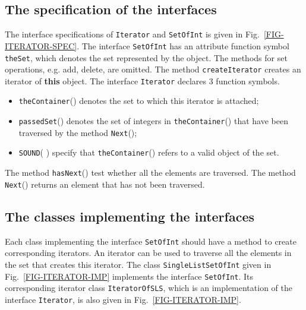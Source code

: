 \documentclass[fleqn]{llncs}
\begin{document}
\subsection{The specification of the interfaces}
The interface specifications of \texttt{Iterator} and \texttt{SetOfInt} is given in Fig.~\ref{FIG-ITERATOR-SPEC}.
The interface \texttt{SetOfInt} has an attribute function symbol \texttt{theSet}, which denotes the set represented by the
object. The methods for set operations, e.g. add, delete, are omitted. The method \texttt{createIterator} creates an iterator of \textbf{this} object.
The interface \texttt{Iterator} declares 3 function symbols.
\begin{itemize}
\item \texttt{theContainer}() denotes the set to which this iterator is attached;
\item \texttt{passedSet}() denotes the set of integers in \texttt{theContainer}() that have been traversed by the method \texttt{Next}();
\item \texttt{SOUND}( ) specify that \texttt{theContainer}() refers to a valid object of the set.
\end{itemize}
The method \texttt{hasNext}() test whether all the elements are traversed. The method \texttt{Next}() returns an element that
has not been traversed.

\subsection{The classes implementing the interfaces}
Each class implementing the interface \texttt{SetOfInt} should have a method to create corresponding iterators. An iterator can be used to traverse
all the elements in the set that creates this iterator.
The class \texttt{SingleListSetOfInt} given in Fig.~\ref{FIG-ITERATOR-IMP} implements the interface \texttt{SetOfInt}. Its corresponding iterator class
\texttt{IteratorOfSLS}, which is an implementation of the interface \texttt{Iterator},  is also given in Fig.~\ref{FIG-ITERATOR-IMP}.
\end{document}
